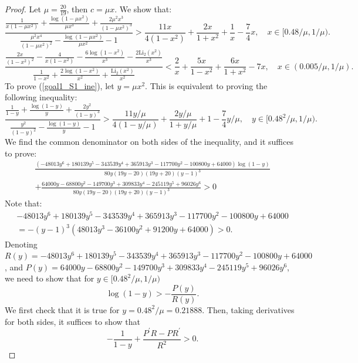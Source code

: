 ﻿\documentclass[10pt]{article}
\begin{document}
\begin{proof}
Let $\mu = \frac{20}{19}$, then $c=\mu x$. We show that:
\begin{equation}
    \frac{\frac{1}{x(1-\mu x^2)}+\frac{\log(1-\mu x^2)}{\mu x^3}+\frac{2\mu^2x^3}{(1-\mu x^2)^3}}{\frac{\mu^2x^4}{(1-\mu x^2)^{2}}-\frac{\log(1-\mu x^2)}{\mu x^2}-1}>\frac{11x}{4(1-x^2)}+\frac{2x}{1+x^2}+\frac{1}{x}-\frac{7}{4}x, \quad x\in[0.48/\mu, 1/\mu).\label{goal1_S1_ine}
\end{equation}
\begin{equation}
    \frac{\frac{2x}{(1-x^2)^2}-\frac{4}{x(1-x^2)}-\frac{6\log(1-x^2)}{x^3}-\frac{2\text{Li}_2(x^2)}{x^3}}{\frac{1}{1-x^2}+\frac{2\log(1-x^2)}{x^2}+\frac{\text{Li}_2(x^2)}{x^2}}<\frac{2}{x}+\frac{5x}{1-x^2}+\frac{6x}{1+x^2}-7x, \quad x\in(0.005/\mu, 1/\mu).\label{goal1_S2_ine}
\end{equation}
To prove (\ref{goal1_S1_ine}), let $y = \mu x^2$. This is equivalent to proving the following inequality:
\begin{equation}
\frac{\frac{1}{1-y}+\frac{\log(1-y)}{y}+\frac{2y^2}{(1-y)^3}}{\frac{y^2}{(1-y)^{2}}-\frac{\log(1-y)}{y}-1}>\frac{11y/\mu}{4(1-y/\mu)}+\frac{2y/\mu}{1+y/\mu}+1-\frac{7}{4}y/\mu, \quad y\in[0.48^2/\mu, 1/\mu).\label{S_1y_ine}
\end{equation}
We find the common denominator on both sides of the inequality, and it suffices to prove:
\begin{equation}
\begin{aligned}
    \frac{(- 48013y^6 + 180139y^5 - 343539y^4 + 365913y^3 - 117700y^2 - 100800y + 64000)\log(1-y)}{80y(19y - 20)(19y + 20)(y - 1)^3}\\
    +\frac{64000y- 68800y^2 - 149700y^3 + 309833y^4 - 245119y^5 + 96026y^6}{80y(19y - 20)(19y + 20)(y - 1)^3}>0
\end{aligned}
\end{equation}
Note that:
\begin{align*}
- 48013y^6 + 180139y^5 - 343539y^4 + 365913y^3 - 117700y^2 - 100800y + 64000\\
= -(y-1)^3(48013y^3 - 36100y^2 + 91200y + 64000)>0.
\end{align*}
Denoting $R(y) = - 48013y^6 + 180139y^5 - 343539y^4 + 365913y^3 - 117700y^2 - 100800y + 64000$, and $P(y) = 64000y- 68800y^2 - 149700y^3 + 309833y^4 - 245119y^5 + 96026y^6$,
we need to show that for $y\in[0.48^2/\mu, 1/\mu)$
$$\log(1-y)>-\frac{P(y)}{R(y)}.
$$
We first check that it is true for $y = 0.48^2/\mu=0.21888$. Then, taking derivatives for both sides, it suffices to show that
$$-\frac{1}{1-y}+\frac{P^{'}R-PR^{'}}{R^2}>0.
$$
\end{proof}
\end{document}
